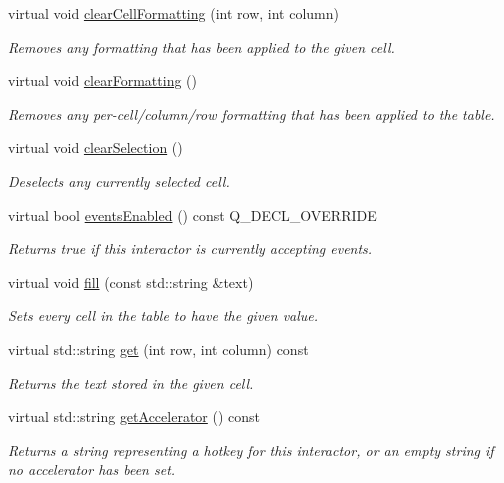 \begin{DoxyCompactItemize}
virtual void \mbox{\hyperlink{classGTable_a5ba4fe558e9d315c123ecd9e896065ca}{clear\+Cell\+Formatting}} (int row, int column)
\begin{DoxyCompactList}\small\item\em Removes any formatting that has been applied to the given cell. \end{DoxyCompactList}\item 
virtual void \mbox{\hyperlink{classGTable_a07ea41be0cdc43ffcd09898d3ae5c523}{clear\+Formatting}} ()
\begin{DoxyCompactList}\small\item\em Removes any per-\/cell/column/row formatting that has been applied to the table. \end{DoxyCompactList}\item 
virtual void \mbox{\hyperlink{classGTable_abd07e172ccec6823a88289c21124a367}{clear\+Selection}} ()
\begin{DoxyCompactList}\small\item\em Deselects any currently selected cell. \end{DoxyCompactList}\item 
virtual bool \mbox{\hyperlink{classGInteractor_ac05ba5b92e2e5146d416fe7f842a0969}{events\+Enabled}} () const Q\+\_\+\+D\+E\+C\+L\+\_\+\+O\+V\+E\+R\+R\+I\+DE
\begin{DoxyCompactList}\small\item\em Returns true if this interactor is currently accepting events. \end{DoxyCompactList}\item 
virtual void \mbox{\hyperlink{classGTable_a1ff40d0915f96652929cfb739bdd969f}{fill}} (const std\+::string \&text)
\begin{DoxyCompactList}\small\item\em Sets every cell in the table to have the given value. \end{DoxyCompactList}\item 
virtual std\+::string \mbox{\hyperlink{classGTable_aaa9971dcb7e1b082abd3b9010667f041}{get}} (int row, int column) const
\begin{DoxyCompactList}\small\item\em Returns the text stored in the given cell. \end{DoxyCompactList}\item 
virtual std\+::string \mbox{\hyperlink{classGInteractor_a69f8d23ed8f207fbecad99960776e942}{get\+Accelerator}} () const
\begin{DoxyCompactList}\small\item\em Returns a string representing a hotkey for this interactor, or an empty string if no accelerator has been set. \end{DoxyCompactList}\item 

\end{DoxyCompactItemize}
